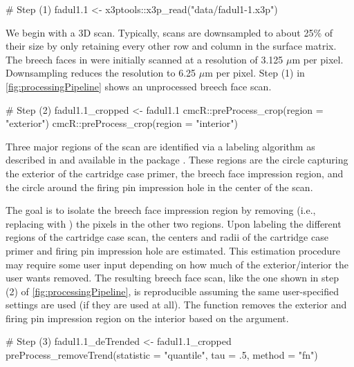 \begin{Schunk}
\begin{Sinput}
# Step (1)
fadul1.1 <- x3ptools::x3p_read("data/fadul1-1.x3p")
\end{Sinput}
\end{Schunk}

We begin with a 3D scan. Typically, scans are downsampled to about 25\%
of their size by only retaining every other row and column in the
surface matrix. The breech faces in \citet{fadul_empirical_2011} were
initially scanned at a resolution of 3.125 \(\mu\)m per pixel.
Downsampling reduces the resolution to 6.25 \(\mu\)m per pixel. Step (1)
in \autoref{fig:processingPipeline} shows an unprocessed breech face
scan.

\begin{Schunk}
\begin{Sinput}
# Step (2)
fadul1.1_cropped <- fadul1.1 %
  cmcR::preProcess_crop(region = "exterior") %
  cmcR::preProcess_crop(region = "interior")
\end{Sinput}
\end{Schunk}

Three major regions of the scan are identified via a labeling algorithm
as described in \citet{hesselink_concurrent_2001} and available in the
 package \citep{imager}. These regions are the circle
capturing the exterior of the cartridge case primer, the breech face
impression region, and the circle around the firing pin impression hole
in the center of the scan.

The goal is to isolate the breech face impression region by removing
(i.e., replacing with ) the pixels in the other two regions.
Upon labeling the different regions of the cartridge case scan, the
centers and radii of the cartridge case primer and firing pin impression
hole are estimated. This estimation procedure may require some user
input depending on how much of the exterior/interior the user wants
removed. The resulting breech face scan, like the one shown in step (2)
of \autoref{fig:processingPipeline}, is reproducible assuming the same
user-specified settings are used (if they are used at all). The
 function removes the exterior and firing pin
impression region on the interior based on the  argument.

\begin{Schunk}
\begin{Sinput}
# Step (3)
fadul1.1_deTrended <- fadul1.1_cropped %
  preProcess_removeTrend(statistic = "quantile", tau = .5, method = "fn")
\end{Sinput}
\end{Schunk}

